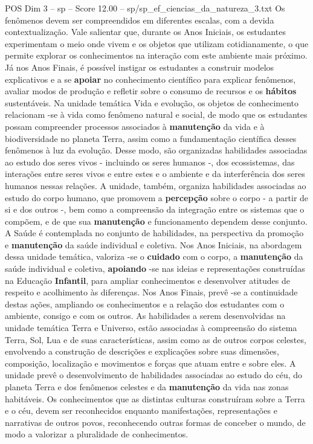 \begin{textsample}{POS Dim 3 – sp – Score 12.00 – sp/sp\_ef\_ciencias\_da\_natureza\_3.txt}
Os fenômenos devem ser compreendidos em diferentes escalas, com a devida contextualização.
Vale salientar que, durante os Anos Iniciais, os estudantes experimentam o meio onde vivem e os objetos que utilizam cotidianamente, o que permite explorar os conhecimentos na interação com este ambiente mais próximo.
Já nos Anos Finais, é possível instigar os estudantes a construir modelos explicativos e a se \textbf{apoiar} no conhecimento científico para explicar fenômenos, avaliar modos de produção e refletir sobre o consumo de recursos e os \textbf{hábitos} sustentáveis.
Na unidade temática Vida e evolução, os objetos de conhecimento relacionam -se à vida como fenômeno natural e social, de modo que os estudantes possam compreender processos associados à \textbf{manutenção} da vida e à biodiversidade no planeta Terra, assim como a fundamentação científica desses fenômenos à luz da evolução.
Desse modo, são organizadas habilidades associadas ao estudo dos seres vivos - incluindo os seres humanos -, dos ecossistemas, das interações entre seres vivos e entre estes e o ambiente e da interferência dos seres humanos nessas relações.
A unidade, também, organiza habilidades associadas ao estudo do corpo humano, que promovem a \textbf{percepção} sobre o corpo - a partir de si e dos outros -, bem como a compreensão da integração entre os sistemas que o compõem, e de que sua \textbf{manutenção} e funcionamento dependem desse conjunto.
A Saúde é contemplada no conjunto de habilidades, na perspectiva da promoção e \textbf{manutenção} da saúde individual e coletiva.
Nos Anos Iniciais, na abordagem dessa unidade temática, valoriza -se o \textbf{cuidado} com o corpo, a \textbf{manutenção} da saúde individual e coletiva, \textbf{apoiando} -se nas ideias e representações construídas na Educação \textbf{Infantil}, para ampliar conhecimentos e desenvolver atitudes de respeito e acolhimento às diferenças.
Nos Anos Finais, prevê -se a continuidade destas ações, ampliando os conhecimentos e a relação dos estudantes com o ambiente, consigo e com os outros.
As habilidades a serem desenvolvidas na unidade temática Terra e Universo, estão associadas à compreensão do sistema Terra, Sol, Lua e de suas características, assim como as de outros corpos celestes, envolvendo a construção de descrições e explicações sobre suas dimensões, composição, localização e movimentos e forças que atuam entre e sobre eles.
A unidade prevê o desenvolvimento de habilidades associadas ao estudo do céu, do planeta Terra e dos fenômenos celestes e da \textbf{manutenção} da vida nas zonas habitáveis.
Os conhecimentos que as distintas culturas construíram sobre a Terra e o céu, devem ser reconhecidos enquanto manifestações, representações e narrativas de outros povos, reconhecendo outras formas de conceber o mundo, de modo a valorizar a pluralidade de conhecimentos.

\end{textsample}
